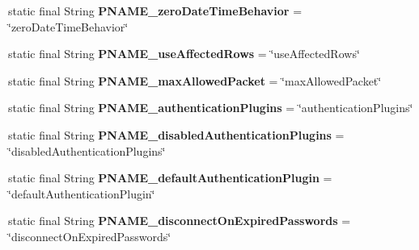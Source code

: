 \begin{DoxyCompactItemize}
static final String {\bfseries P\+N\+A\+M\+E\+\_\+zero\+Date\+Time\+Behavior} = \char`\"{}zero\+Date\+Time\+Behavior\char`\"{}
\item 
\mbox{\label{classcom_1_1mysql_1_1cj_1_1conf_1_1_property_definitions_a4f1a7f330a32c03213a89e8e5c969028}} 
static final String {\bfseries P\+N\+A\+M\+E\+\_\+use\+Affected\+Rows} = \char`\"{}use\+Affected\+Rows\char`\"{}
\item 
\mbox{\label{classcom_1_1mysql_1_1cj_1_1conf_1_1_property_definitions_a12f43563b2f4047d96e88f0b90244c83}} 
static final String {\bfseries P\+N\+A\+M\+E\+\_\+max\+Allowed\+Packet} = \char`\"{}max\+Allowed\+Packet\char`\"{}
\item 
\mbox{\label{classcom_1_1mysql_1_1cj_1_1conf_1_1_property_definitions_af67c9f06e1c400a154e85fba3fd8b9bc}} 
static final String {\bfseries P\+N\+A\+M\+E\+\_\+authentication\+Plugins} = \char`\"{}authentication\+Plugins\char`\"{}
\item 
\mbox{\label{classcom_1_1mysql_1_1cj_1_1conf_1_1_property_definitions_a0ec19d37227a630405c73fffa35364cf}} 
static final String {\bfseries P\+N\+A\+M\+E\+\_\+disabled\+Authentication\+Plugins} = \char`\"{}disabled\+Authentication\+Plugins\char`\"{}
\item 
\mbox{\label{classcom_1_1mysql_1_1cj_1_1conf_1_1_property_definitions_a72a1e46c50c1917022b9ffe7a68f88b2}} 
static final String {\bfseries P\+N\+A\+M\+E\+\_\+default\+Authentication\+Plugin} = \char`\"{}default\+Authentication\+Plugin\char`\"{}
\item 
\mbox{\label{classcom_1_1mysql_1_1cj_1_1conf_1_1_property_definitions_abf3c7c45ecf2dfc204a1da7553d83be2}} 
static final String {\bfseries P\+N\+A\+M\+E\+\_\+disconnect\+On\+Expired\+Passwords} = \char`\"{}disconnect\+On\+Expired\+Passwords\char`\"{}
\item 
\mbox{\label{classcom_1_1mysql_1_1cj_1_1conf_1_1_property_definitions_a84c685723d365050673daed9b28b6f30}} 

\end{DoxyCompactItemize}
